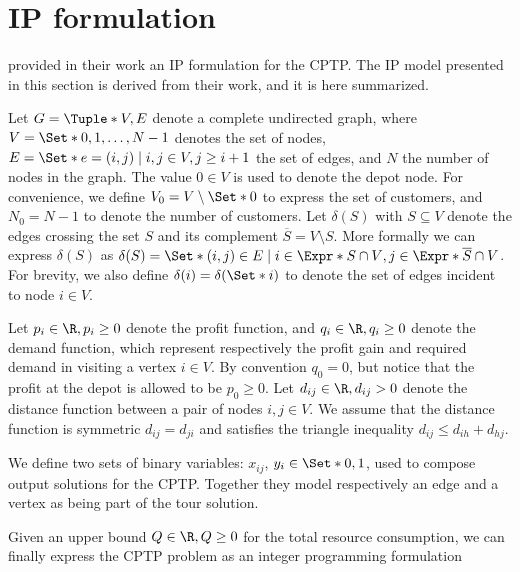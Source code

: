 \chapter{IP formulation}

\cite{Jepsen2014} provided in their work an IP formulation for the CPTP.
The IP model presented in this section is derived from their work, and it is here summarized.

Let $G = \Tuple*{V, E}$ denote a complete undirected graph, where $V = \Set*{0, 1, \dots, N - 1}$ denotes the set of nodes,
$E = \Set*{e = (i, j) \mid i,j \in V, j \ge i + 1}$ the set of edges, and $N$ the number of nodes in the graph.
The value $0 \in V$ is used to denote the depot node.
For convenience, we define $V_0 = V \setminus \Set*{0}$ to express the set of customers, and $N_0 = N - 1$ to denote the number of customers.
Let $\delta(S)$ with $S \subseteq V$ denote the edges crossing the set $S$ and its complement $\overline{S} = V \setminus S$.
More formally we can express $\delta(S)$ as $\delta(S) = \Set*{ (i, j) \in E \mid i \in \Expr*{S \cap V}, j \in \Expr*{ \overline{S} \cap V } }$.
For brevity, we also define $\delta(i) = \delta(\Set*{i})$ to denote the set of edges incident to node $i \in V$.

Let $p_{i} \in \R, p_{i} \ge 0$ denote the profit function, and $q_{i} \in \R, q_{i} \ge 0$ denote the demand function, which represent respectively the profit gain and required demand in visiting a vertex $i \in V$.
By convention $q_0 = 0$, but notice that the profit at the depot is allowed to be $p_0 \ge 0$.
Let $d_{ij} \in \R, d_{ij} > 0$ denote the distance function between a pair of nodes  $i, j \in V$.
We assume that the distance function is symmetric $d_{ij} = d_{ji}$ and satisfies the triangle inequality $d_{ij} \le d_{ih} + d_{hj}$.

We define two sets of binary variables: $x_{ij}$, $y_{i} \in \Set*{0, 1}$, used to compose output solutions for the CPTP.
Together they model respectively an edge and a vertex as being part of the tour solution.

Given an upper bound $Q \in \R,Q \ge 0$ for the total resource consumption, we can finally express the CPTP problem as an integer programming formulation


